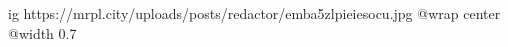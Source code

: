  
 
 
 
 

\ifcmt
  ig https://mrpl.city/uploads/posts/redactor/emba5zlpieiesocu.jpg
  @wrap center
  @width 0.7
\fi
